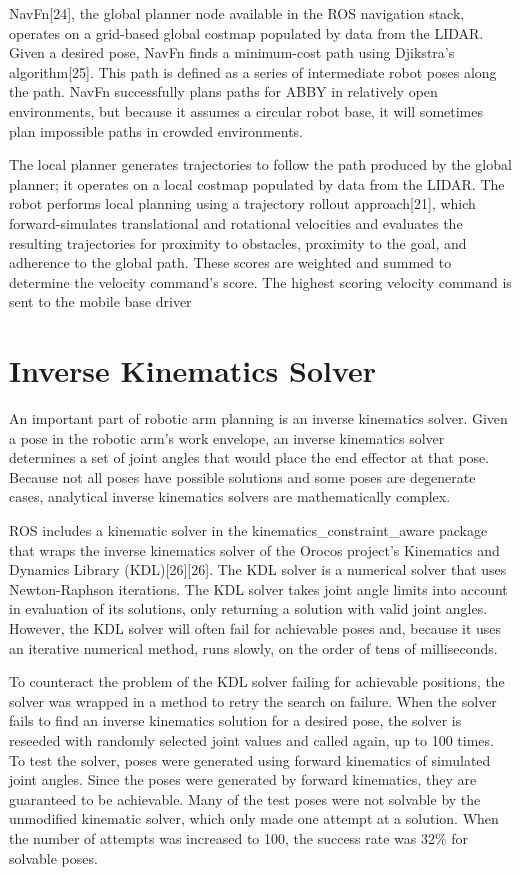 \documentclass[]{cwru} %
\begin{document}
NavFn{[}24{]}, the global planner node available in the ROS navigation
stack, operates on a grid-based global costmap populated by data from
the LIDAR. Given a desired pose, NavFn finds a minimum-cost path using
Djikstra's algorithm{[}25{]}. This path is defined as a series of
intermediate robot poses along the path. NavFn successfully plans paths
for ABBY in relatively open environments, but because it assumes a
circular robot base, it will sometimes plan impossible paths in crowded
environments.

The local planner generates trajectories to follow the path produced by
the global planner; it operates on a local costmap populated by data
from the LIDAR. The robot performs local planning using a trajectory
rollout approach{[}21{]}, which forward-simulates translational and
rotational velocities and evaluates the resulting trajectories for
proximity to obstacles, proximity to the goal, and adherence to the
global path. These scores are weighted and summed to determine the
velocity command's score. The highest scoring velocity command is sent
to the mobile base driver

\section{Inverse Kinematics Solver}

An important part of robotic arm planning is an inverse kinematics
solver. Given a pose in the robotic arm's work envelope, an inverse
kinematics solver determines a set of joint angles that would place the
end effector at that pose. Because not all poses have possible solutions
and some poses are degenerate cases, analytical inverse kinematics
solvers are mathematically complex.

ROS includes a kinematic solver in the kinematics\_constraint\_aware
package that wraps the inverse kinematics solver of the Orocos project's
Kinematics and Dynamics Library (KDL){[}26{]}{[}26{]}. The KDL solver is
a numerical solver that uses Newton-Raphson iterations. The KDL solver
takes joint angle limits into account in evaluation of its solutions,
only returning a solution with valid joint angles. However, the KDL
solver will often fail for achievable poses and, because it uses an
iterative numerical method, runs slowly, on the order of tens of
milliseconds.

To counteract the problem of the KDL solver failing for achievable
positions, the solver was wrapped in a method to retry the search on
failure. When the solver fails to find an inverse kinematics solution
for a desired pose, the solver is reseeded with randomly selected joint
values and called again, up to 100 times. To test the solver, poses were
generated using forward kinematics of simulated joint angles. Since the
poses were generated by forward kinematics, they are guaranteed to be
achievable. Many of the test poses were not solvable by the unmodified
kinematic solver, which only made one attempt at a solution. When the
number of attempts was increased to 100, the success rate was 32\% for
solvable poses.
\end{document}
